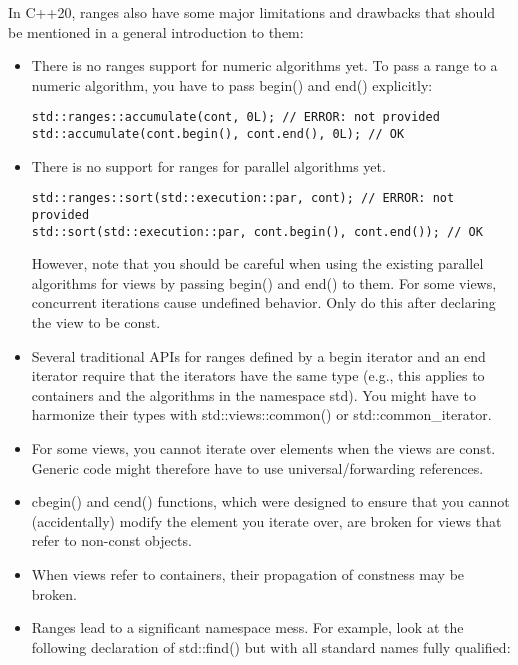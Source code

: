 In C++20, ranges also have some major limitations and drawbacks that should be mentioned in a general introduction to them:

\begin{itemize}
\item
There is no ranges support for numeric algorithms yet. To pass a range to a numeric algorithm, you have to pass begin() and end() explicitly:

\begin{lstlisting}[style=styleCXX]
std::ranges::accumulate(cont, 0L); // ERROR: not provided
std::accumulate(cont.begin(), cont.end(), 0L); // OK
\end{lstlisting}

\item
There is no support for ranges for parallel algorithms yet.

\begin{lstlisting}[style=styleCXX]
std::ranges::sort(std::execution::par, cont); // ERROR: not provided
std::sort(std::execution::par, cont.begin(), cont.end()); // OK
\end{lstlisting}

However, note that you should be careful when using the existing parallel algorithms for views by passing begin() and end() to them. For some views, concurrent iterations cause undefined behavior. Only do this after declaring the view to be const.

\item
Several traditional APIs for ranges defined by a begin iterator and an end iterator require that the iterators have the same type (e.g., this applies to containers and the algorithms in the namespace std). You might have to harmonize their types with std::views::common() or std::common\_iterator.

\item
For some views, you cannot iterate over elements when the views are const. Generic code might therefore have to use universal/forwarding references.

\item
cbegin() and cend() functions, which were designed to ensure that you cannot (accidentally) modify the element you iterate over, are broken for views that refer to non-const objects.

\item
When views refer to containers, their propagation of constness may be broken.

\item
Ranges lead to a significant namespace mess. For example, look at the following declaration of std::find() but with all standard names fully qualified:


\end{itemize}
